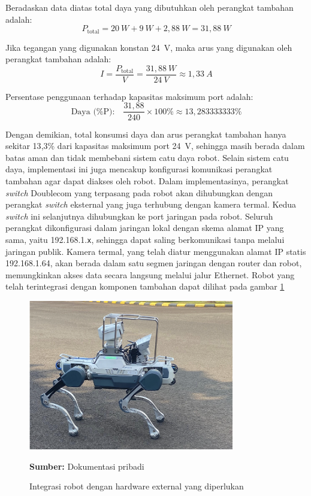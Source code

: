 Beradaskan data diatas total daya yang dibutuhkan oleh perangkat tambahan adalah:
\[
P_{\text{total}} = 20~W + 9~W + 2{,}88~W = 31{,}88~W
\]

Jika tegangan yang digunakan konstan 24~V, maka arus yang digunakan oleh perangkat tambahan adalah:
\[
I = \frac{P_{\text{total}}}{V} = \frac{31{,}88~W}{24~V} \approx 1{,}33~A
\]

Persentase penggunaan terhadap kapasitas maksimum port adalah:
\[
\text{Daya (\%P):} \quad \frac{31{,}88}{240} \times 100\% \approx 13{,}283333333\%
\]

Dengan demikian, total konsumsi daya dan arus perangkat tambahan hanya sekitar 13{,}3\% dari kapasitas maksimum port 24~V, sehingga masih berada dalam batas aman dan tidak membebani sistem catu daya robot. Selain sistem catu daya, implementasi ini juga mencakup konfigurasi komunikasi perangkat tambahan agar dapat diakses oleh robot. Dalam implementasinya, perangkat \emph{switch} Doublecom yang terpasang pada robot akan dihubungkan dengan perangkat \emph{switch} eksternal yang juga terhubung dengan kamera termal. Kedua \emph{switch} ini selanjutnya dihubungkan ke port jaringan pada robot. Seluruh perangkat dikonfigurasi dalam jaringan lokal dengan skema alamat IP yang sama, yaitu 192.168.1.\texttt{x}, sehingga dapat saling berkomunikasi tanpa melalui jaringan publik. Kamera termal, yang telah diatur menggunakan alamat IP statis 192.168.1.64, akan berada dalam satu segmen jaringan dengan router dan robot, memungkinkan akses data secara langsung melalui jalur Ethernet. Robot yang telah terintegrasi dengan komponen tambahan dapat dilihat pada gambar \ref{fig:sistem-elec-robot}


\begin{figure}[H]
  \centering
  \includegraphics[width=0.8\textwidth]{gambar/bab3/impl-elec2.png}
  \caption{Integrasi robot dengan hardware external yang diperlukan}
  \label{fig:sistem-elec-robot}
  \footnotesize{\textbf{Sumber:} Dokumentasi pribadi}
\end{figure}

